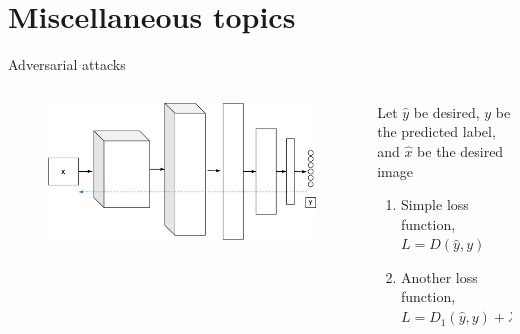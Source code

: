 \section{Miscellaneous topics}

\begin{frame}{Adversarial attacks}
\begin{columns}
	\begin{column}{.5\textwidth}
		\begin{figure}
			\includegraphics[width=1\textwidth]{figures/adverserial-net}
		\end{figure}
	\end{column}
	\begin{column}{.5\textwidth}
		Let $\hat{y}$ be desired,  $y$ be the predicted label, 
		and $\hat{x}$ be the desired image 
		\begin{enumerate}
			\item Simple loss function, $L=D(\hat{y},y)$
			\item Another loss function, $L=D_1(\hat{y},y) + \lambda D_2(\hat{x},x) $
		\end{enumerate}
	\end{column}
\end{columns}
\end{frame}
